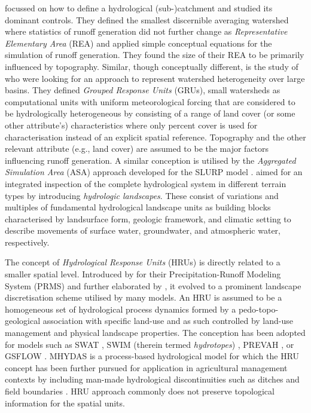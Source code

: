 \DIFaddend \citet{Wood1988} focussed on how to define a hydrological (sub-)catchment and studied its dominant controls.
They defined the smallest discernible averaging watershed where statistics of runoff generation did not further change as \emph{Representative Elementary Area} (REA) and applied simple conceptual equations for the simulation of runoff generation.
They found the size of their REA to be primarily influenced by topography.
Similar, though conceptually different, is the study of \citet{Kouwen1993} who were looking for an approach to represent watershed heterogeneity over large basins.
They defined \emph{Grouped Response Units} (GRUs), small watersheds as computational units with uniform meteorological forcing that are considered to be hydrologically heterogeneous by consisting of a range of land cover (or some other attribute's) characteristics where only percent cover is used for characterisation instead of an explicit spatial reference.
Topography and the other relevant attribute (e.g., land cover) are assumed to be the major factors influencing runoff generation.
A similar conception is utilised by the \emph{Aggregated Simulation Area} (ASA) approach developed for the SLURP model \citep{Kite1995}.
\citet{Winter2001} aimed for an integrated inspection of the complete hydrological system in different terrain types by introducing \emph{hydrologic landscapes}.
These consist of variations and multiples of fundamental hydrological landscape units as building blocks characterised by landsurface form, geologic framework, and climatic setting to describe movements of surface water, groundwater, and atmospheric water, respectively.

The concept of \emph{Hydrological Response Units} (HRUs) is directly related to a smaller spatial level.
Introduced by \citet{Leavesley1983} for their Precipitation-Runoff Modeling System (PRMS) and further elaborated by \citet{Fluegel1995}, it evolved to a prominent landscape discretisation scheme utilised by many models.
An HRU is assumed to be a homogeneous set of hydrological process dynamics formed by a pedo-topo-geological association with specific land-use and as such controlled by land-use management and physical landscape properties.
The conception has been adopted for models such as SWAT \citep{Manguerra1998}, SWIM (therein termed \emph{hydrotopes}) \citep{Krysanova1998}, PREVAH \citep{Viviroli2009}, or GSFLOW \citep{Markstrom2008}.
MHYDAS is a process-based hydrological model for which the HRU concept has been further pursued for application in agricultural management contexts by including man-made hydrological discontinuities such as ditches and field boundaries \citep{Moussa2002}.
\DIFdelbegin {}\DIFdelend \DIFaddbegin {}\DIFaddend HRU approach commonly does not preserve topological information for the spatial units.
\DIFaddbegin {}\DIFaddend 

